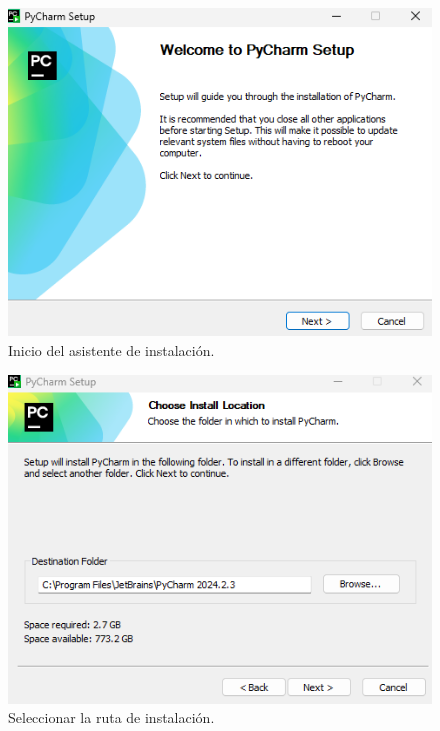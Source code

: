 \documentclass{article}
\begin{document}
\begin{figure}[H]
    \centering
    \includegraphics[scale=0.8]{py2.png}
    \caption{Inicio del asistente de instalación.}
\end{figure}

\begin{figure}[H]
    \centering
    \includegraphics[scale=0.8]{py3.png}
    \caption{Seleccionar la ruta de instalación.}
\end{figure}
\end{document}
